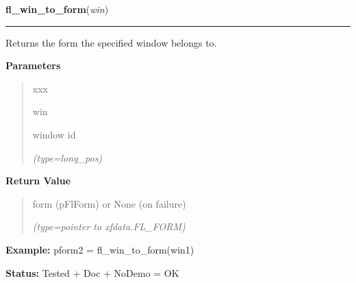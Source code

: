     \vspace{0.5ex}

\hspace{.8\funcindent}\begin{boxedminipage}{\funcwidth}

    \raggedright \textbf{fl\_win\_to\_form}(\textit{win})

    \vspace{-1.5ex}

    \rule{\textwidth}{0.5\fboxrule}
\setlength{\parskip}{2ex}
    Returns the form the specified window belongs to.

\setlength{\parskip}{1ex}
      \textbf{Parameters}
      \vspace{-1ex}

      \begin{quote}
        \begin{Ventry}{xxx}

          \item[win]

          window id

            {\it (type=long\_pos)}

        \end{Ventry}

      \end{quote}

      \textbf{Return Value}
    \vspace{-1ex}

      \begin{quote}
      form (pFlForm) or None (on failure)

      {\it (type=pointer to xfdata.FL\_FORM)}

      \end{quote}

\textbf{Example:} pform2 = fl\_win\_to\_form(win1)



\textbf{Status:} Tested + Doc + NoDemo = OK



    \end{boxedminipage}

    \label{xformslib:flxbasic:fl_set_form_icon}

    \vspace{0.5ex}

